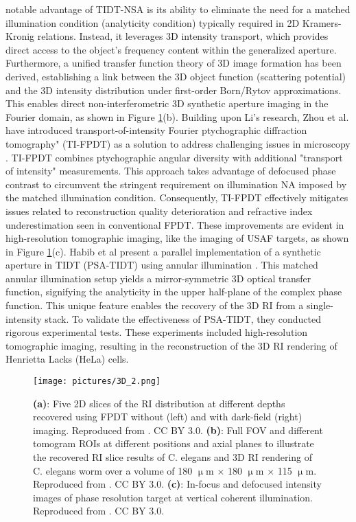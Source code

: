 \documentclass[journal,review,submit,pdftex,moreauthors]{Definitions/mdpi}
\begin{document}
notable advantage of TIDT-NSA is its ability to eliminate the need for a matched illumination condition (analyticity condition) typically required in 2D Kramers-Kronig relations. Instead, it leverages 3D intensity transport, which provides direct access to the object's frequency content within the generalized aperture. Furthermore, a unified transfer function theory of 3D image formation has been derived, establishing a link between the 3D object function (scattering potential) and the 3D intensity distribution under first-order Born/Rytov approximations. This enables direct non-interferometric 3D synthetic aperture imaging in the Fourier domain, as shown in Figure \ref{3D_2}(b). Building upon Li's research, Zhou et al. have introduced transport-of-intensity Fourier ptychographic diffraction tomography" (TI-FPDT) as a solution to address challenging issues in microscopy \cite{zhou2022transport}. TI-FPDT combines ptychographic angular diversity with additional "transport of intensity" measurements. This approach takes advantage of defocused phase contrast to circumvent the stringent requirement on illumination NA imposed by the matched illumination condition. Consequently, TI-FPDT effectively mitigates issues related to reconstruction quality deterioration and refractive index underestimation seen in conventional FPDT. These improvements are evident in high-resolution tomographic imaging, like the imaging of USAF targets, as shown in Figure \ref{3D_2}(c). Habib et al present a parallel implementation of a synthetic aperture in TIDT (PSA-TIDT) using annular illumination \cite{ ullah2023parallel}. This matched annular illumination setup yields a mirror-symmetric 3D optical transfer function, signifying the analyticity in the upper half-plane of the complex phase function. This unique feature enables the recovery of the 3D RI from a single-intensity stack. To validate the effectiveness of PSA-TIDT, they conducted rigorous experimental tests. These experiments included high-resolution tomographic imaging, resulting in the reconstruction of the 3D RI rendering of Henrietta Lacks (HeLa) cells.
\begin{figure}[H]
\texttt{[image: pictures/3D\_2.png]}
\caption{\textbf{(a)}: Five 2D slices of the RI distribution at different depths recovered using FPDT without (left) and with dark-field (right) imaging. Reproduced from \cite{ zuo2020wide}. CC BY 3.0.
\textbf{(b)}: Full FOV and different tomogram ROIs at different positions and axial planes to illustrate the recovered RI slice results of C. elegans and 3D RI rendering of C. elegans worm over a volume of 180 $\upmu$m × 180 $\upmu$m × 115 $\upmu$m. Reproduced from \cite{li2022transport}. CC BY 3.0.
\textbf{(c)}: In-focus and defocused intensity images of phase resolution target at vertical coherent illumination. Reproduced from \cite{zhou2022transport}. CC BY 3.0.
\label{3D_2}}
\end{figure}
\end{document}
